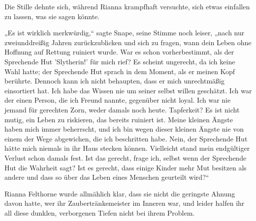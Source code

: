 Die Stille dehnte sich, während Rianna krampfhaft versuchte, sich etwas einfallen zu lassen, was sie sagen könnte.

„Es ist wirklich merkwürdig,“ sagte Snape, seine Stimme noch leiser, „nach nur zweiunddreißig Jahren zurückzublicken und sich zu fragen, wann dein Leben ohne Hoffnung auf Rettung ruiniert wurde. War es schon vorherbestimmt, als der Sprechende Hut 'Slytherin!' für mich rief? Es scheint ungerecht, da ich keine Wahl hatte; der Sprechende Hut sprach in dem Moment, als er meinen Kopf berührte. Dennoch kann ich nicht behaupten, dass er mich unrechtmäßig einsortiert hat. Ich habe das Wissen nie um seiner selbst willen geschätzt. Ich war der einen Person, die ich Freund nannte, gegenüber nicht loyal. Ich war nie jemand für gerechten Zorn, weder damals noch heute. Tapferkeit? Es ist nicht mutig, ein Leben zu riskieren, das bereits ruiniert ist. Meine kleinen Ängste haben mich immer beherrscht, und ich bin wegen dieser kleinen Ängste nie von einem der Wege abgewichen, die ich beschritten habe. Nein, der Sprechende Hut hätte mich niemals in ihr Haus stecken können. Vielleicht stand mein endgültiger Verlust schon damals fest. Ist das gerecht, frage ich, selbst wenn der Sprechende Hut die Wahrheit sagt? Ist es gerecht, dass einige Kinder mehr Mut besitzen als andere und dass so über das Leben eines Menschen geurteilt wird?“

Rianna Felthorne wurde allmählich klar, dass sie nicht die geringste Ahnung davon hatte, wer ihr Zaubertränkemeister im Inneren war, und leider halfen ihr all diese dunklen, verborgenen Tiefen nicht bei ihrem Problem.

